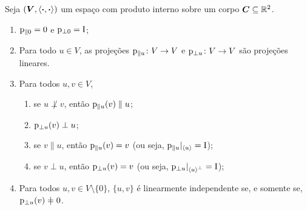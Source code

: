 \begin{proposition}
Seja $(\bm V,\left\langle{\bm{\cdot}},{\bm{\cdot}}\right\rangle)$ um espaço com produto interno sobre um corpo $\bm C \subseteq \mathbb{R}^2$.
	\begin{enumerate}
	\item $\mathrm{p}_{\parallel 0} = 0$ e $\mathrm{p}_{\perp 0} = \mathrm{I}$;
	\item Para todo $u \in V$, as projeções $\mathrm{p}_{\parallel u}\colon V \to V$ e $\mathrm{p}_{\perp u}\colon V \to V$ são projeções lineares.
	\item Para todos $u, v \in V$,
		\begin{enumerate}
		\item se $u \not\perp v$, então $\mathrm{p}_{\parallel u}(v) \parallel u$;
		\item $\mathrm{p}_{\perp u}(v) \perp u$;
		\item se $v \parallel u$, então $\mathrm{p}_{\parallel u}(v) = v$ (ou seja, $\mathrm{p}_{\parallel u}|_{\left\langle u \right\rangle} = \mathrm{I}$);
		\item se $v \perp u$, então $\mathrm{p}_{\perp u}(v) = v$ (ou seja, $\mathrm{p}_{\perp u}|_{\left\langle u \right\rangle^\perp} = \mathrm{I}$);
		\end{enumerate}
	\item Para todos $u,v \in V \setminus \{0\}$, $\{u,v\}$ é linearmente independente se, e somente se, $\proj_{\perp u}(v) \neq 0$.
	\end{enumerate}
\end{proposition}
